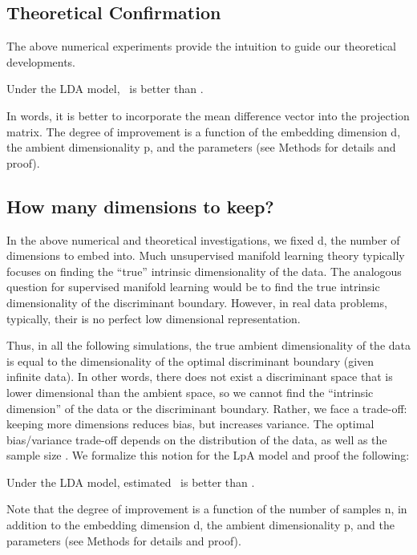 \documentclass[10pt]{article}
\begin{document}
\subsection*{Theoretical Confirmation}

The above numerical experiments provide the intuition to guide our theoretical developments.  
\begin{thm} \label{thm:LDA}
Under the LDA model, \Lol~is better than \Pca.
\end{thm}
In words, it is better to incorporate the mean difference vector into the projection matrix.  The degree of improvement is a function of the embedding dimension d, the ambient dimensionality p, and the parameters (see Methods for details and proof).



\subsection*{How many dimensions to keep?}

In the above numerical and theoretical investigations, we fixed d, the number of dimensions to embed into.  Much unsupervised manifold learning theory typically focuses on finding the ``true'' intrinsic dimensionality of the data.   The analogous question for supervised manifold learning would be to find the true intrinsic dimensionality of the discriminant boundary.  However, in real data problems, typically, their is no perfect low dimensional representation.

Thus, in all the following simulations, the true ambient dimensionality of the data is equal to the dimensionality of the optimal discriminant boundary (given infinite data).  In other words, there does not exist a discriminant space that is lower dimensional than the ambient space, so we cannot find the ``intrinsic dimension'' of the data or the discriminant boundary.  Rather, we face a trade-off: keeping more dimensions reduces bias, but increases variance.  The optimal bias/variance trade-off depends on the distribution of the data, as well as the sample size \cite{Trunk1979}.  We formalize this notion for the LpA model and proof the following:
\begin{thm} \label{thm:n}
Under the LDA model, estimated \Lol~is better than \Pca.
\end{thm}
Note that the degree of improvement is a function of the number of samples n, in addition to the embedding dimension d, the ambient dimensionality p, and the parameters (see Methods for details and proof).
\end{document}
